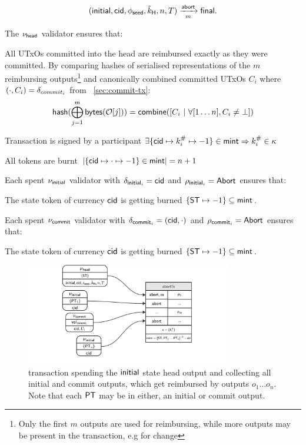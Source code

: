 \[
	(\mathsf{initial},\mathsf{cid},\phi_{\mathsf{seed}},\tilde{k}_{\mathsf{H}},n,T) \xrightarrow[m]{\mathsf{abort}} \mathsf{final}.
\]

\begin{samepage}
	\noindent The $\nu_\mathsf{head}$ validator ensures that:
	\begin{menumerate}
		\item All UTxOs committed into the head are reimbursed exactly as they were
		committed. By comparing hashes of serialised representations of the $m$
		reimbursing outputs\footnote{Only the first $m$ outputs are used for
			reimbursing, while more outputs may be present in the transaction, e.g for
			change} and canonically combined committed UTxOs $C_{i}$ where $(\cdot, C_{i}) = \delta_{commit_{i}}$ from \mtxCom{}~\ref{sec:commit-tx}:
		\[
			\mathsf{hash}(\bigoplus_{j=1}^{m} \mathsf{bytes}(\mathcal{O}[j])) = \mathsf{combine}([C_{i} ~ | ~ \forall [1\dots n], C_{i} \neq \bot])
		\]

		\item Transaction is signed by a participant $\exists \{\mathsf{cid} \mapsto k^{\#}_{i} \mapsto -1\} \in \mathsf{mint} \Rightarrow k^{\#}_{i} \in \kappa$
		\item All tokens are burnt
		$|\{\mathsf{cid} \mapsto \cdot \mapsto -1\} \in \mathsf{mint}| = n + 1$
	\end{menumerate}
\end{samepage}

\noindent Each spent $\nu_{\mathsf{initial}}$ validator with $\delta_{\mathsf{initial}_{i}} = \mathsf{cid}$ and $\rho_{\mathsf{initial}_{i}} = \mathsf{Abort}$ ensures that:
\begin{menumerate}
	\item The state token of currency $\mathsf{cid}$ is getting burned $\{\mathsf{ST} \mapsto -1\} \subseteq \mathsf{mint}$.
\end{menumerate}

\noindent Each spent $\nu_{\mathsf{commit}}$ validator with $\delta_{\mathsf{commit}_{i}} = (\mathsf{cid},\cdot)$ and $\rho_{\mathsf{commit}_{i}} = \mathsf{Abort}$ ensures that:
\begin{menumerate}
	\item The state token of currency $\mathsf{cid}$ is getting burned $\{\mathsf{ST} \mapsto -1\} \subseteq \mathsf{mint}$.
\end{menumerate}

\begin{figure}[h]
	\centering
	\includegraphics[width=0.8\textwidth]{figures/abortTx.pdf}
	\caption{\mtxAbort{} transaction spending the $\mathsf{initial}$ state head
		output and collecting all initial and commit outputs, which get reimbursed
		by outputs $o_{1} \dots o_{n}$. Note that each $\mathsf{PT}$ may be in either, an
		initial or commit output.}\label{fig:abortTx}
\end{figure}

